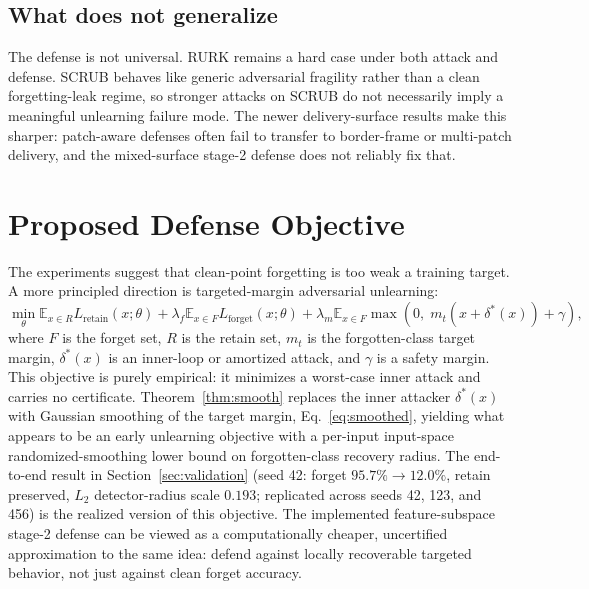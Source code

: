 \documentclass{article}
\begin{document}
\subsection{What does not generalize}
The defense is not universal. RURK remains a hard case under both attack and defense. SCRUB behaves like generic adversarial fragility rather than a clean forgetting-leak regime, so stronger attacks on SCRUB do not necessarily imply a meaningful unlearning failure mode. The newer delivery-surface results make this sharper: patch-aware defenses often fail to transfer to border-frame or multi-patch delivery, and the mixed-surface stage-2 defense does not reliably fix that.

\section{Proposed Defense Objective}
The experiments suggest that clean-point forgetting is too weak a training target. A more principled direction is targeted-margin adversarial unlearning:
\begin{equation}
\min_{\theta}
\mathbb{E}_{x \in R} L_{\text{retain}}(x;\theta)
 + \lambda_f \mathbb{E}_{x \in F} L_{\text{forget}}(x;\theta)
 + \lambda_m \mathbb{E}_{x \in F} \max\!\left(0,\; m_t(x + \delta^*(x)) + \gamma \right),
\label{eq:proposed}
\end{equation}
where $F$ is the forget set, $R$ is the retain set, $m_t$ is the forgotten-class target margin, $\delta^*(x)$ is an inner-loop or amortized attack, and $\gamma$ is a safety margin. This objective is purely empirical: it minimizes a worst-case inner attack and carries no certificate. Theorem~\ref{thm:smooth} replaces the inner attacker $\delta^*(x)$ with Gaussian smoothing of the target margin, Eq.~\eqref{eq:smoothed}, yielding what appears to be an early unlearning objective with a per-input input-space randomized-smoothing lower bound on forgotten-class recovery radius. The end-to-end result in Section~\ref{sec:validation} (seed 42: forget $95.7\%\to12.0\%$, retain preserved, $L_2$ detector-radius scale $0.193$; replicated across seeds 42, 123, and 456) is the realized version of this objective. The implemented feature-subspace stage-2 defense can be viewed as a computationally cheaper, uncertified approximation to the same idea: defend against locally recoverable targeted behavior, not just against clean forget accuracy.
\end{document}
